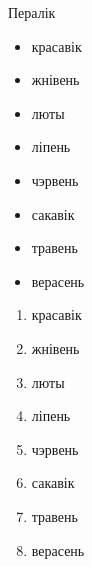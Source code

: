 \documentclass[hyperref={pdftex,unicode}]{beamer}
\begin{document}
\begin{frame}{Пералік}

\begin{multicols}{2}
  \begin{itemize}
  \item{красавік}
  \item{жнівень}
  \item{люты}
  \item{ліпень}
  \item{чэрвень}
  \item{сакавік}
  \item{травень}
  \item{верасень}
  \end{itemize}

  \begin{enumerate}
  \item{красавік}
  \item{жнівень}
  \item{люты}
  \item{ліпень}
  \item{чэрвень}
  \item{сакавік}
  \item{травень}
  \item{верасень}
  \end{enumerate}
\end{multicols}

\end{frame}
\end{document}
